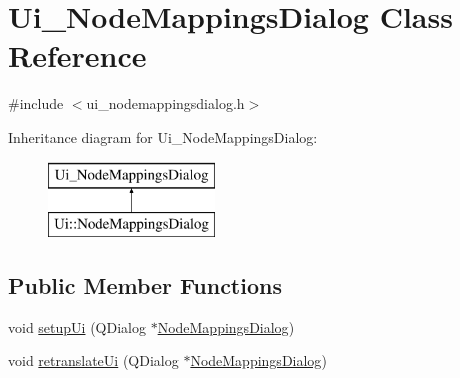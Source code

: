\hypertarget{class_ui___node_mappings_dialog}{}\section{Ui\+\_\+\+Node\+Mappings\+Dialog Class Reference}
\label{class_ui___node_mappings_dialog}


{\ttfamily \#include $<$ui\+\_\+nodemappingsdialog.\+h$>$}

Inheritance diagram for Ui\+\_\+\+Node\+Mappings\+Dialog\+:\begin{figure}[H]
\begin{center}
\leavevmode
\includegraphics[height=2.000000cm]{df/d17/class_ui___node_mappings_dialog}
\end{center}
\end{figure}
\subsection*{Public Member Functions}
\begin{DoxyCompactItemize}
\item 
void \mbox{\hyperlink{class_ui___node_mappings_dialog_aacfb4e2a77731654a3f49f97f309c008}{setup\+Ui}} (Q\+Dialog $\ast$\mbox{\hyperlink{class_node_mappings_dialog}{Node\+Mappings\+Dialog}})
\item 
void \mbox{\hyperlink{class_ui___node_mappings_dialog_ac06af93662762f4a913745df44b89a37}{retranslate\+Ui}} (Q\+Dialog $\ast$\mbox{\hyperlink{class_node_mappings_dialog}{Node\+Mappings\+Dialog}})
\end{DoxyCompactItemize}
